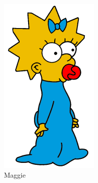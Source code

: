 \documentclass[journal]{IEEEtran}
\begin{document}
\begin{figure}[!htb]
\begin{subfigure}[b]{0.15\textwidth}
        \includegraphics[width=\textwidth]{maggie001}
        \caption{Maggie}
        \label{fig:maggie}
    \end{subfigure}
    ~ %
    \begin{subfigure}[b]{0.15\textwidth}

\end{subfigure}
\end{figure}
\end{document}
